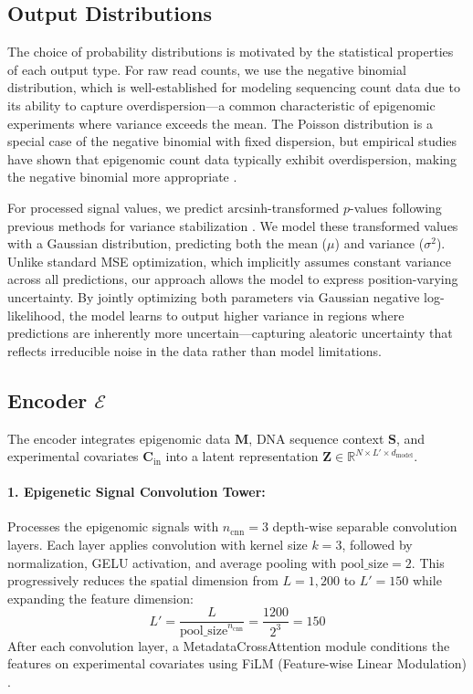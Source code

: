 \subsection{Output Distributions}

The choice of probability distributions is motivated by the statistical properties of each output type. For raw read counts, we use the negative binomial distribution, which is well-established for modeling sequencing count data due to its ability to capture overdispersion---a common characteristic of epigenomic experiments where variance exceeds the mean. The Poisson distribution is a special case of the negative binomial with fixed dispersion, but empirical studies have shown that epigenomic count data typically exhibit overdispersion, making the negative binomial more appropriate \cite{anders2010differential}.

For processed signal values, we predict $\text{arcsinh}$-transformed $p$-values following previous methods for variance stabilization \cite{hoffman2012unsupervised}. We model these transformed values with a Gaussian distribution, predicting both the mean ($\mu$) and variance ($\sigma^2$). Unlike standard MSE optimization, which implicitly assumes constant variance across all predictions, our approach allows the model to express position-varying uncertainty. By jointly optimizing both parameters via Gaussian negative log-likelihood, the model learns to output higher variance in regions where predictions are inherently more uncertain---capturing aleatoric uncertainty that reflects irreducible noise in the data rather than model limitations.

\subsection{Encoder $\mathcal{E}$}

The encoder integrates epigenomic data $\mathbf{M}$, DNA sequence context $\mathbf{S}$, and experimental covariates $\mathbf{C}_{\text{in}}$ into a latent representation $\mathbf{Z} \in \mathbb{R}^{N \times L' \times d_{\text{model}}}$.

\paragraph{1. Epigenetic Signal Convolution Tower:}
Processes the epigenomic signals with $n_{\text{cnn}} = 3$ depth-wise separable convolution layers. Each layer applies convolution with kernel size $k = 3$, followed by normalization, GELU activation, and average pooling with $\text{pool\_size} = 2$. This progressively reduces the spatial dimension from $L = 1{,}200$ to $L' = 150$ while expanding the feature dimension:
\begin{equation}
    L' = \frac{L}{\text{pool\_size}^{n_{\text{cnn}}}} = \frac{1200}{2^3} = 150
\end{equation}
After each convolution layer, a MetadataCrossAttention module conditions the features on experimental covariates using FiLM (Feature-wise Linear Modulation) \cite{perez2018film}.

